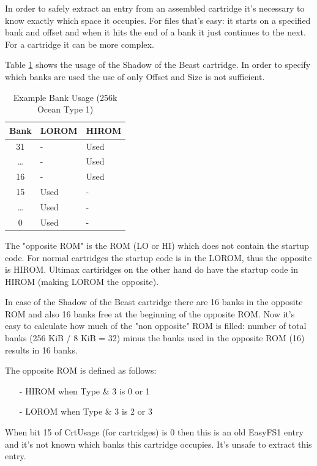 \documentclass[a4paper,oneside]{memoir}
\begin{document}
In order to safely extract an entry from an assembled cartridge it's
necessary to know exactly which space it occupies. For files that's easy:
it starts on a specified bank and offset and when it hits the end of a bank
it just continues to the next. For a cartridge it can be more complex.

Table \ref{tab:bank-usage-oc1-256k} shows the usage of the Shadow of the Beast cartridge.
In order to specify which banks are used the use of only Offset and Size is not sufficient.

\begin{table}[!htbp]
    \centering
    \begin{tabularx}{0.6\textwidth}{c|X|X}
        \toprule
        Bank & LOROM & HIROM \\
        \midrule
        31 & - & Used \\
        \ldots & - & Used \\
        16 & - & Used \\
        15 & Used & - \\
        \ldots & Used & - \\
        0 & Used & - \\
        \bottomrule
    \end{tabularx}
    \caption{Example Bank Usage (256k Ocean Type 1)}
    \label{tab:bank-usage-oc1-256k}
\end{table}

The "opposite ROM" is the ROM (LO or HI) which does not contain the startup code.
For normal cartridges the startup code is in the LOROM, thus the opposite is HIROM.
Ultimax cartiridges on the other hand do have the startup code in HIROM
(making LOROM the opposite).

In case of the Shadow of the Beast cartridge
there are 16 banks in the opposite ROM and also 16 banks free at the
beginning of the opposite ROM. Now it's easy to calculate how much of the
"non opposite" ROM is filled: number of total banks (256 KiB / 8 KiB = 32)
minus the banks used in the opposite ROM (16) results in 16 banks.

The opposite ROM is defined as follows:
\begin{itemize}
\item[-] HIROM when Type \& 3 is 0 or 1
\item[-] LOROM when Type \& 3 is 2 or 3
\end{itemize}

When bit 15 of CrtUsage (for cartridges) is 0 then this is an old EasyFS1
entry and it's not known which banks this cartridge occupies.
It's unsafe to extract this entry.
\end{document}
